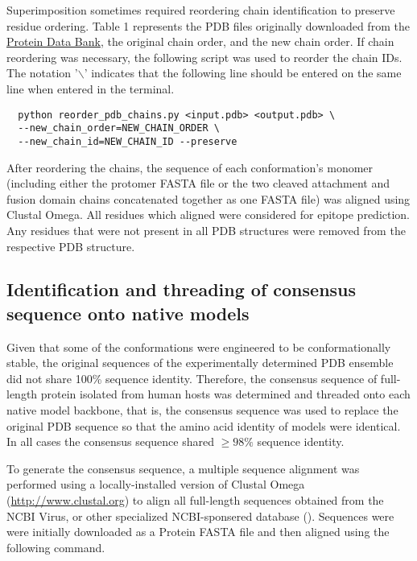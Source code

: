 \documentclass[10pt]{article}
\begin{document}
Superimposition sometimes required reordering chain identification to preserve residue ordering. Table 1 represents the PDB files originally downloaded from the \href{www.rcsb.org}{Protein Data Bank}, the original chain order, and the new chain order. If chain reordering was necessary, the following script was used to reorder the chain IDs.\\
The notation '\texttt{$\backslash$}' indicates that the following line should be entered on the same line when entered in the terminal.
\begin{lstlisting}
  python reorder_pdb_chains.py <input.pdb> <output.pdb> \
  --new_chain_order=NEW_CHAIN_ORDER \
  --new_chain_id=NEW_CHAIN_ID --preserve
\end{lstlisting}

After reordering the chains, the sequence of each conformation's monomer (including either the protomer FASTA file or the two cleaved attachment and fusion domain chains concatenated together as one FASTA file) was aligned using Clustal Omega. All residues which aligned were considered for epitope prediction. Any residues that were not present in all PDB structures were removed from the respective PDB structure.

\subsection{Identification and threading of consensus sequence onto native models}\label{sec:msa}

Given that some of the conformations were engineered to be conformationally stable, the original sequences of the experimentally determined PDB ensemble did not share 100\% sequence identity. Therefore, the consensus sequence of full-length protein isolated from human hosts was determined and threaded onto each native model backbone, that is, the consensus sequence was used to replace the original PDB sequence so that the amino acid identity of models were identical. In all cases the consensus sequence shared $\geq 98\%$ sequence identity.  

To generate the consensus sequence, a multiple sequence alignment was performed using a locally-installed version of Clustal Omega (\url{http://www.clustal.org}) to align all full-length sequences obtained from the NCBI Virus, or other specialized NCBI-sponsered database (\Fref[plain]{tab:access_dates}). Sequences were were initially downloaded as a Protein FASTA file and then aligned using the following command.\\
\end{document}
